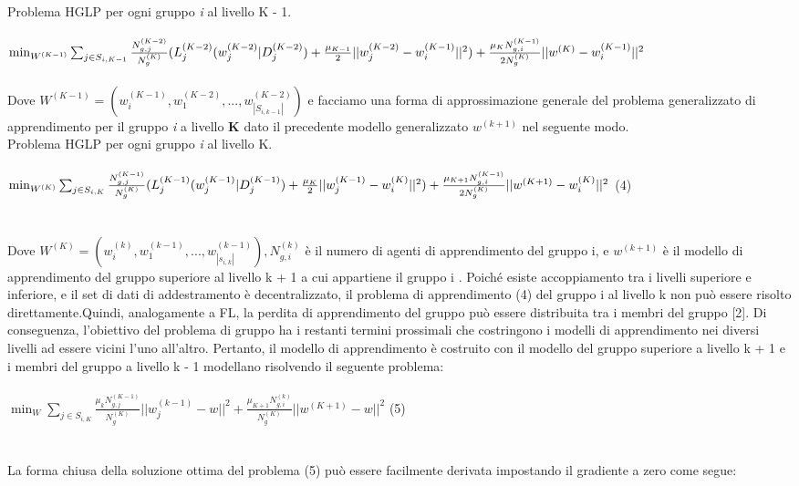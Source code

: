 \begin{itemize}
Problema HGLP per ogni gruppo \textsl{i} al livello K - 1.\\\\
$\min_{W^{(K-1)}}\sum_{j\in S_{i,K-1}} \frac{N_{g,j}^{(K-2)}}{N_g^{(K)}}(L_j^{(K-2)}(w_j^{(K-2)}|D_j^{(K-2)}) \\+\frac{\mu_{K-1}}{2}||w_j^{(K-2)}-w_i^{(K-1)}||^2)+ \frac{\mu_{K}N_{g,i}^{(K-1)}}{2N_g^{(K)}}||w^{(K)}-w_i^{(K-1)}||^2$\\\\
Dove $W^{(K-1)} = (w_i^{(K-1)},w_1^{(K-2)},...,w_{|S_{i,k-1}|}^{(K-2)})$ e facciamo una forma di approssimazione generale del problema generalizzato di apprendimento per il gruppo \textsl{i} a livello \textbf{K} dato il precedente modello generalizzato $w^{(k+1)}$ nel seguente modo.\\
Problema HGLP per ogni gruppo \textsl{i} al livello K.\\\\
$\min_{W^{(K)}}\sum_{j\in S_{i,K}} \frac{N_{g,j}^{(K-1)}}{N_g^{(K)}}(L_j^{(K-1)}(w_j^{(K-1)}|D_j^{(K-1)}) \\+\frac{\mu_{K}}{2}||w_j^{(K-1)}-w_i^{(K)}||^2)+ \frac{\mu_{K+1}N_{g,i}^{(K-1)}}{2N_g^{(K)}}||w^{(K+1)}-w_i^{(K)}||^2$ \hspace{1cm} (4)\\\\\\

Dove $W^{(K)} = (w_i^{(k)},w_1^{(k-1)},...,w_{|s_{i,k}|}^{(k-1)}),N_{g,i}^{(k)}$ è il numero di agenti di apprendimento del gruppo i, e $w^{(k+1)}$ è il modello di apprendimento del gruppo superiore al livello k + 1 a cui appartiene il gruppo i . Poiché esiste accoppiamento tra i livelli superiore e inferiore, e il set di dati di addestramento è decentralizzato, il problema di apprendimento (4) del gruppo i al livello k non può essere risolto direttamente.Quindi, analogamente a FL, la perdita di apprendimento del gruppo può essere distribuita tra i membri del gruppo [2]. Di conseguenza, l'obiettivo del problema di gruppo ha i restanti termini prossimali che costringono i modelli di apprendimento nei diversi livelli ad essere vicini l'uno all'altro. Pertanto, il modello di apprendimento è costruito con il modello del gruppo superiore a livello k + 1 e i membri del gruppo a livello k - 1 modellano risolvendo il seguente problema:\\
\\
$\min_{W}\sum_{j\in S_{i,K}} \frac{\mu_kN_{g,j}^{(K-1)}}{N_g^{(K)}}||w_j^{(k-1)}-w||^2+\frac{\mu_{K+1}N_{g,i}^{(k)}}{N_g^{(K)}}||w^{(K+1)}-w||^2$ \hspace{1cm} (5)\\\\\\
La forma chiusa della soluzione ottima del problema (5) può essere facilmente derivata impostando il gradiente a zero come segue:\\





\end{itemize}